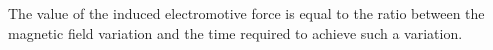 The value of the induced electromotive force is equal to the ratio between the 
magnetic field variation and the time
required to achieve such a variation.